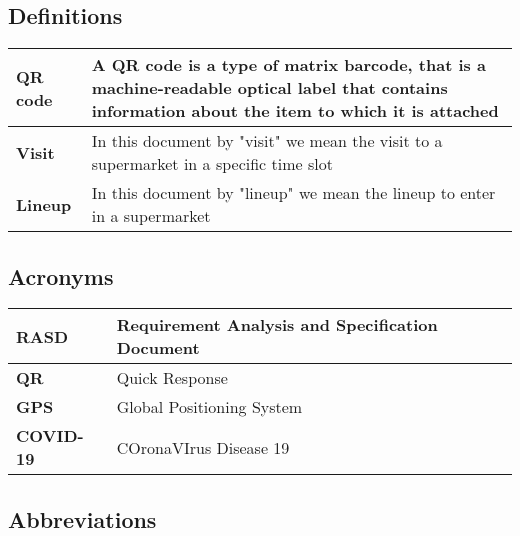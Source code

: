 \subsection{Definitions}

    \begin{center}
        {\renewcommand{\arraystretch}{2.4}%
        \begin{tabular}{L{2cm}L{14cm}}
            \hline
            \textbf{QR code} & A QR code is a type of matrix barcode, that is a machine-readable optical label that 
            contains information about the item to which it is attached \\
            \hline
            \textbf{Visit} & In this document by "visit" we mean the visit to a supermarket in a specific time slot \\
            \hline
            \textbf{Lineup} & In this document by "lineup" we mean the lineup to enter in a supermarket \\
            \hline
        \end{tabular}}
    \end{center}
    

\subsection{Acronyms}

    \begin{center}
        {\renewcommand{\arraystretch}{2.4}%
        \begin{tabular}{L{2cm}L{14cm}}
            \hline
            \textbf{RASD} & Requirement Analysis and Specification Document \\
            \hline
            \textbf{QR} & Quick Response \\
            \hline
            \textbf{GPS} & Global Positioning System \\
            \hline
            \textbf{COVID-19} & COronaVIrus Disease 19 \\
            \hline
        \end{tabular}}
    \end{center}

\subsection{Abbreviations}

